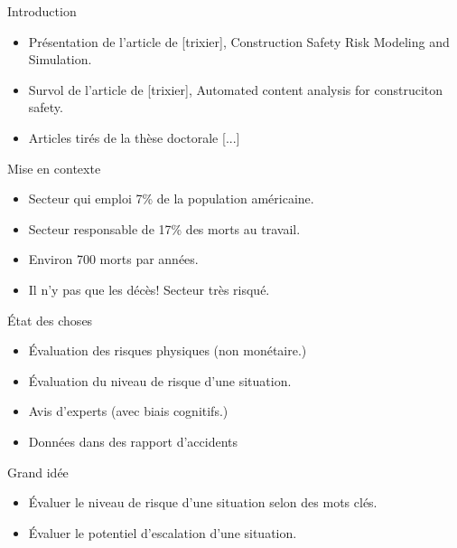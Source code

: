 

\begin{frame}[label=intro]{Introduction}
	\begin{itemize}
		\item Présentation de l'article de [trixier], Construction Safety Risk Modeling and Simulation.
		\item Survol de l'article de [trixier], Automated content analysis for construciton safety.	
		\item Articles tirés de la thèse doctorale [...]
	\end{itemize}
	\end{frame}


\begin{frame}[label=intro]{Mise en contexte}
	\begin{itemize}
		\item Secteur qui emploi 7\% de la population américaine.
		\item Secteur responsable de 17\% des morts au travail.
		\item Environ 700 morts par années.
		\item Il n'y pas que les décès! Secteur très risqué.
	\end{itemize}
	\end{frame}


\begin{frame}[label=intro]{État des choses}
	\begin{itemize}
		\item Évaluation des risques physiques (non monétaire.)
		\item Évaluation du niveau de risque d'une situation.
		\item Avis d'experts (avec biais cognitifs.)
		\item Données dans des rapport d'accidents	
	\end{itemize}
\end{frame}


\begin{frame}[label=intro]{Grand idée}
	\begin{itemize}
		\item Évaluer le niveau de risque d'une situation selon des mots clés.
		\item Évaluer le potentiel d'escalation d'une situation.
	\end{itemize}
\end{frame}


